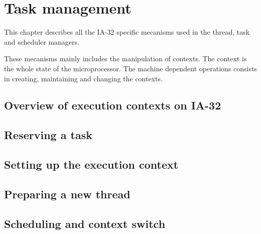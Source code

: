 %
%
%
%
%
%

%
%

\chapter{Task management}

This chapter describes all the IA-32 specific mecanisms used in the
thread, task and scheduler managers.

These mecanisms mainly includes the manipulation of contexts. The
context is the whole state of the microprocessor. The machine
dependent operations consists in creating, maintaining and changing
the contexts.

\newpage

%
%

\section{Overview of execution contexts on IA-32}

%
%

\section{Reserving a task}

%
%

\section{Setting up the execution context}

%
%

\section{Preparing a new thread}

%
%

\section{Scheduling and context switch}

